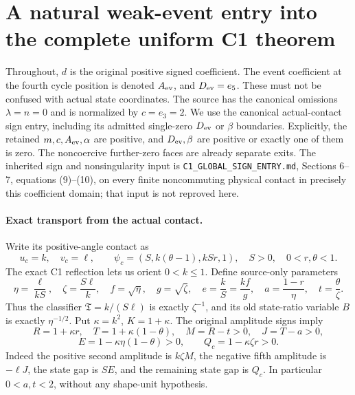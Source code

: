 \section{A natural weak-event entry into the complete uniform C1 theorem}

Throughout, $d$ is the original positive signed coefficient. The event
coefficient at the fourth cycle position is denoted $A_{\rm ev}$, and
$D_{\rm ev}=e_5$. These must not be confused with actual state coordinates.
The source has the canonical omissions $\lambda=n=0$ and is normalized
by $c=e_3=2$. We use the canonical actual-contact sign entry, including
its admitted single-zero $D_{\rm ev}$ or $\beta$ boundaries. Explicitly,
the retained $m,c,A_{\rm ev},\alpha$ are positive, and $D_{\rm ev},\beta$
are positive or exactly one of them is zero. The noncoercive further-zero
faces are already separate exits. The inherited sign and nonsingularity
input is \texttt{C1\_GLOBAL\_SIGN\_ENTRY.md}, Sections 6--7, equations
(9)--(10), on every finite noncommuting physical contact in precisely this
coefficient domain; that input is not reproved here.

\paragraph{Exact transport from the actual contact.}
Write its positive-angle contact as
\[
 u_c=k,\quad v_c=\ell,\qquad
 \psi_c=(S,k(\theta-1),kSr,1),\quad
 S>0,\quad 0<r,\theta<1.
\]
The exact C1 reflection lets us orient $0<k\le1$. Define source-only
parameters
\[
 \eta=\frac{\ell}{kS},\quad \zeta=\frac{S\ell}{k},\quad
 f=\sqrt\eta,\quad g=\sqrt\zeta,\quad
 e=\frac{k}{S}=\frac{kf}{g},\quad
 a=\frac{1-r}{\eta},\quad t=\frac\theta\zeta.
                                                               \tag{CE1}
\]
Thus the classifier $\mathfrak T=k/(S\ell)$ is exactly $\zeta^{-1}$,
and its old state-ratio variable $B$ is exactly $\eta^{-1/2}$.
Put $\kappa=k^2$, $K=1+\kappa$. The original amplitude signs imply
\[
 R=1+\kappa r,\quad T=1+\kappa(1-\theta),\quad
 M=R-t>0,\quad J=T-a>0,
\]
\[
 E=1-\kappa\eta(1-\theta)>0,\qquad
 Q_c=1-\kappa\zeta r>0.                              \tag{CE2}
\]
Indeed the positive second amplitude is $k\zeta M$, the negative
fifth amplitude is $-\ell J$, the state gap is $SE$, and the remaining
state gap is $Q_c$. In particular $0<a,t<2$, without any shape-unit
hypothesis.

